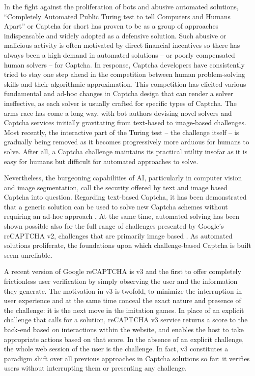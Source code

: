 In the fight against the proliferation of bots and abusive automated solutions, ``Completely Automated Public Turing test to tell Computers and Humans Apart'' or Captcha for short has proven to be as a group of approaches \cite{xu2020survey} indispensable and widely adopted as a defensive solution.
Such abusive or malicious activity is often motivated by direct financial incentives so there has always been a high demand in automated solutions -- or poorly compensated human solvers -- for Captcha.
In response, Captcha developers have consistently tried to stay one step ahead in the competition between human problem-solving skills and their algorithmic approximation.
This competition has elicited various fundamental and ad-hoc changes in Captcha design that can render a solver ineffective, as each solver is usually crafted for specific types of Captcha.
The arms race has come a long way, with bot authors devising novel solvers and Captcha services initially gravitating from text-based to image-based challenges.
Most recently, the interactive part of the Turing test -- the challenge itself -- is gradually being removed as it becomes progressively more arduous for humans to solve.
After all, a Captcha challenge maintains its practical utility insofar as it is easy for humans but difficult for automated approaches to solve.

Nevertheless, the burgeoning capabilities of AI, particularly in computer vision and image segmentation, call the security offered by text and image based Captcha into question.
Regarding text-based Captcha, it has been demonstrated that a generic solution can be used to solve new Captcha schemes without requiring an ad-hoc approach \cite{bursztein2014end}.
At the same time, automated solving has been shown possible also for the full range of challenges presented by Google's reCAPTCHA v2, challenges that are primarily image based \cite{sivakorn2016robot}.
As automated solutions proliferate, the foundations upon which challenge-based Captcha is built seem unreliable.

A recent version of Google reCAPTCHA is v3 and the first to offer completely frictionless user verification by simply observing the user and the information they generate.
The motivation in v3 is twofold, to minimize the interruption in user experience and at the same time conceal the exact nature and presence of the challenge: it is the next move in the imitation games.
In place of an explicit challenge that calls for a solution, reCAPTCHA v3 service returns a score to the back-end based on interactions within the website, and enables the host to take appropriate actions based on that score.
In the absence of an explicit challenge, the whole web session of the user is the challenge.
In fact, v3 constitutes a paradigm shift over all previous approaches in Captcha solutions so far: it
verifies users without interrupting them or presenting any challenge.

